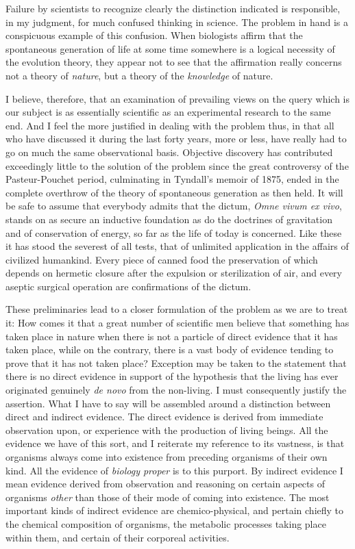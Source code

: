 \documentclass[a4paper, 11pt, oneside, polutonikogreek, english]{article}
\begin{document}
Failure by scientists to recognize clearly the distinction indicated is responsible, in my judgment, for much confused thinking in science. The problem in hand is a conspicuous example of this confusion. When biologists affirm that the spontaneous generation of life at some time somewhere is a logical necessity of the evolution theory, they appear not to see that the affirmation really concerns not a theory of \emph{nature}, but a theory of the \emph{knowledge} of nature.

I believe, therefore, that an examination of prevailing views on the query which is our subject is as essentially scientific as an experimental research to the same end. And I feel the more justified in dealing with the problem thus, in that all who have discussed it during the last forty years, more or less, have really had to go on much the same observational basis. Objective discovery has contributed exceedingly little to the solution of the problem since the great controversy of the Pasteur-Pouchet period, culminating in Tyndall's memoir of 1875, ended in the complete overthrow of the theory of spontaneous generation as then held. It will be safe to assume that everybody admits that the dictum, \emph{Omne vivum ex vivo}, stands on as secure an inductive foundation as do the doctrines of gravitation and of conservation of energy, so far as the life of today is concerned. Like these it has stood the severest of all tests, that of unlimited application in the affairs of civilized humankind. Every piece of canned food the preservation of which depends on hermetic closure after the expulsion or sterilization of air, and every aseptic surgical operation are confirmations of the dictum.

These preliminaries lead to a closer formulation of the problem as we are to treat it: How comes it that a great number of scientific men believe that something has taken place in nature when there is not a particle of direct evidence that it has taken place, while on the contrary, there is a vast body of evidence tending to prove that it has not taken place? Exception may be taken to the statement that there is no direct evidence in support of the hypothesis that the living has ever originated genuinely \emph{de novo} from the non-living. I must consequently justify the assertion. What I have to say will be assembled around a distinction between direct and indirect evidence. The direct evidence is derived from immediate observation upon, or experience with the production of living beings. All the evidence we have of this sort, and I reiterate my reference to its vastness, is that organisms always come into existence from preceding organisms of their own kind. All the evidence of \emph{biology proper} is to this purport. By indirect evidence I mean evidence derived from observation and reasoning on certain aspects of organisms \emph{other} than those of their mode of coming into existence. The most important kinds of indirect evidence are chemico-physical, and pertain chiefly to the chemical composition of organisms, the metabolic processes taking place within them, and certain of their corporeal activities.
\end{document}
